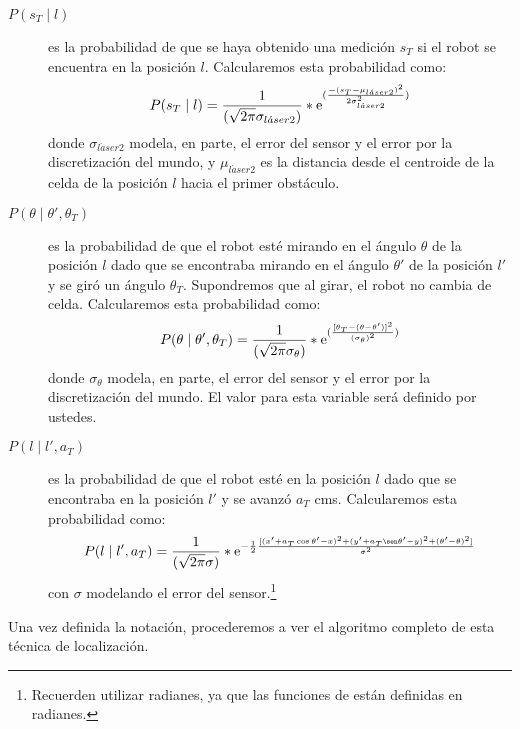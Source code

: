 \begin{description}
  \item[$P(s_T \mid l)$] es la probabilidad de que se haya obtenido una medición \(s_T\) si el robot se encuentra en la posición \(l\). Calcularemos esta probabilidad como:
  \begin{align}
    P(s_T \mid l) = {1 \over (\sqrt{2\pi}\sigma_{l\acute{a}ser2})}*\mathrm{e}^{({{-(s_T - \mu_{l\acute{a}ser2})^2} \over {2\sigma_{l\acute{a}ser2}^2}})}
    \label{eq:Pmedicion}
  \end{align}
  donde \(\sigma_{l\acute{a}ser2}\) modela, en parte, el error del sensor y el error por la discretización del mundo, y \(\mu_{l\acute{a}ser2}\) es la distancia desde el centroide de la celda de la posición \(l\) hacia el primer obstáculo.

  \item[$P(\theta \mid \theta', \theta_T)$] es la probabilidad de que el robot esté mirando en el ángulo \(\theta\) de la posición \(l\) dado que se encontraba mirando en el ángulo \(\theta'\) de la posición \(l'\) y se giró un ángulo \(\theta_T\). Supondremos que al girar, el robot no cambia de celda. Calcularemos esta probabilidad como:
  \begin{align}
    P(\theta \mid \theta', \theta_T) = {1 \over (\sqrt{2\pi}\sigma_\theta)}*\mathrm{e}^{({{[\theta_T - (\theta - \theta')]^2} \over {{(\sigma_\theta)}^2}})}
    \label{eq:Podometro}
  \end{align}
  donde \(\sigma_{\theta}\) modela, en parte, el error del sensor y el error por la discretización del mundo. El valor para esta variable será definido por ustedes.

  \item[$P(l \mid l', a_T)$] es la probabilidad de que el robot esté en la posición \(l\) dado que se encontraba en la posición \(l'\) y se avanzó \(a_T\) cms. Calcularemos esta probabilidad como:
  \begin{align}
    P(l \mid l', a_T) = {1 \over (\sqrt{2\pi}\sigma)}*\me^{ -{{1} \over {2}} {{[{ {{ (x' + a_T \cos \theta' - x)^2 } +  { (y' + a_T \sen \theta' - y)^2 } } } + {(\theta' - \theta)^2}]}\over{\sigma^2}}}
    \label{eq:Pgiro}
  \end{align}
  con $\sigma$  modelando el error del sensor.\footnote{Recuerden utilizar radianes, ya que las funciones de  están definidas en radianes.}

\end{description}


Una vez definida la notación, procederemos a ver el algoritmo completo de esta técnica de localización.



